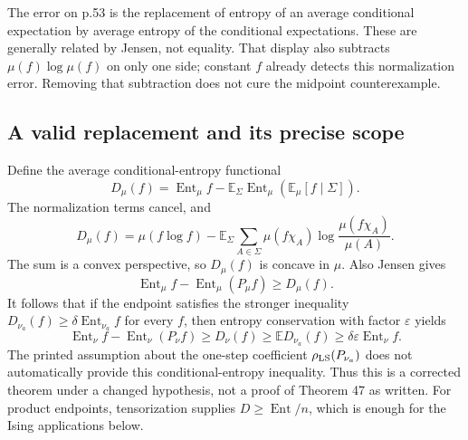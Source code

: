 \documentclass[10pt]{article}
\begin{document}
The error on p.53 is the replacement of entropy of an average conditional expectation by average entropy of the conditional expectations. These are generally related by Jensen, not equality. That display also subtracts \(\mu(f)\log\mu(f)\) on only one side; constant \(f\) already detects this normalization error. Removing that subtraction does not cure the midpoint counterexample.\par
\subsection*{A valid replacement and its precise scope}
Define the average conditional-entropy functional \[D_\mu(f)=\operatorname{Ent}_\mu f-
    \mathbb E_\Sigma\operatorname{Ent}_\mu\!\left(\mathbb E_\mu[f\mid\Sigma]\right).\] The normalization terms cancel, and \[D_\mu(f)=\mu(f\log f)-
 \mathbb E_\Sigma\sum_{A\in\Sigma}\mu(f\chi_A)
             \log\frac{\mu(f\chi_A)}{\mu(A)}.\] The sum is a convex perspective, so \(D_\mu(f)\) is concave in \(\mu\). Also Jensen gives \[\operatorname{Ent}_\mu f-\operatorname{Ent}_\mu(P_\mu f)\ge D_\mu(f).\] It follows that if the endpoint satisfies the stronger inequality \(D_{\nu_a}(f)\ge\delta\operatorname{Ent}_{\nu_a}f\) for every \(f\), then entropy conservation with factor \(\varepsilon\) yields \[\operatorname{Ent}_\nu f-\operatorname{Ent}_\nu(P_\nu f)
 \ge D_\nu(f)\ge\mathbb ED_{\nu_a}(f)
 \ge\delta\varepsilon\operatorname{Ent}_\nu f.\] The printed assumption about the one-step coefficient \(\rho_{\rm LS}(P_{\nu_a})\) does not automatically provide this conditional-entropy inequality. Thus this is a corrected theorem under a changed hypothesis, not a proof of Theorem 47 as written. For product endpoints, tensorization supplies \(D\ge\operatorname{Ent}/n\), which is enough for the Ising applications below.\par
\end{document}
